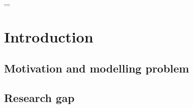 \documentclass[a4paper,fleqn]{cas-dc}
\begin{document}

\begin{abstract}
Here goes the abstract \nocite{*}%
\end{abstract}


\begin{highlights}
\item 
\item 
\item 
\end{highlights}



\begin{keywords}
 \sep \sep \sep
\end{keywords}

\maketitle

\section{Introduction}


\subsection{Motivation and modelling problem}

\subsection{Research gap}
\end{document}
